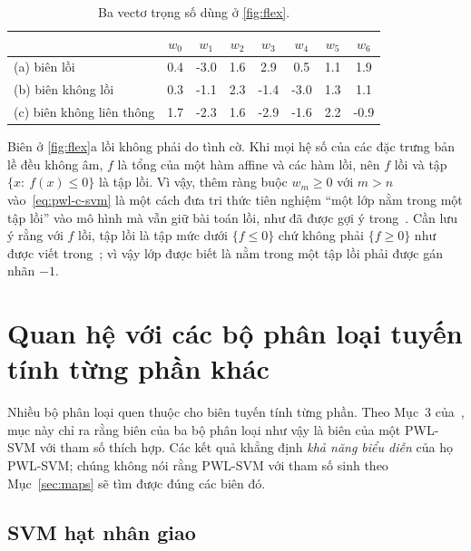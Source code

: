 \begin{table}[t]
\centering
\caption[Ba vectơ trọng số cho cùng một ánh xạ HH]{Ba vectơ trọng số dùng ở \cref{fig:flex}.}
\label{tab:flex}
\small
\begin{tabular}{@{}l *{7}{S[table-format=-1.1]}@{}}
\toprule
& {$w_0$} & {$w_1$} & {$w_2$} & {$w_3$} & {$w_4$} & {$w_5$} & {$w_6$}\\
\midrule
(a) biên lồi & 0.4 & -3.0 & 1.6 & 2.9 & 0.5 & 1.1 & 1.9\\
(b) biên không lồi & 0.3 & -1.1 & 2.3 & -1.4 & -3.0 & 1.3 & 1.1\\
(c) biên không liên thông & 1.7 & -2.3 & 1.6 & -2.9 & -1.6 & 2.2 & -0.9\\
\bottomrule
\end{tabular}
\end{table}

\begin{remark}\label{rem:convex}
Biên ở \cref{fig:flex}a lồi không phải do tình cờ. Khi mọi hệ số của các đặc trưng bản lề đều không âm, $f$ là tổng của một hàm affine và các hàm lồi, nên $f$ lồi và tập $\{x:\ f(x)\le0\}$ là tập lồi. Vì vậy, thêm ràng buộc $w_m\ge0$ với $m>n$ vào~\eqref{eq:pwl-c-svm} là một cách đưa tri thức tiên nghiệm “một lớp nằm trong một tập lồi” vào mô hình mà vẫn giữ bài toán lồi, như đã được gợi ý trong~\cite[Mục~5]{huang2013}. Cần lưu ý rằng với $f$ lồi, tập lồi là tập mức dưới $\{f\le0\}$ chứ không phải $\{f\ge0\}$ như được viết trong~\cite{huang2013}; vì vậy lớp được biết là nằm trong một tập lồi phải được gán nhãn $-1$.
\end{remark}

\section{Quan hệ với các bộ phân loại tuyến tính từng phần khác}\label{sec:relations}

Nhiều bộ phân loại quen thuộc cho biên tuyến tính từng phần. Theo Mục~3 của~\cite{huang2013}, mục này chỉ ra rằng biên của ba bộ phân loại như vậy là biên của một PWL-SVM với tham số thích hợp. Các kết quả khẳng định \emph{khả năng biểu diễn} của họ PWL-SVM; chúng không nói rằng PWL-SVM với tham số sinh theo Mục~\ref{sec:maps} sẽ tìm được đúng các biên đó.

\subsection{SVM hạt nhân giao}

